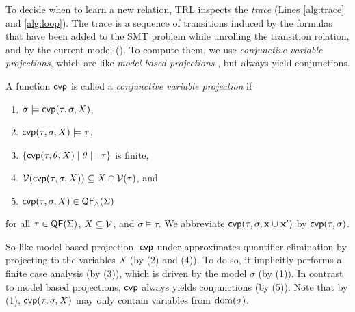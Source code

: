 To decide when to learn a new relation, TRL inspects the \emph{trace} (Lines \ref{alg:trace} and \ref{alg:loop}).
%
The trace is a sequence of transitions induced by the formulas that have been added to the SMT problem while unrolling the transition relation, and by the current model ().
%
To compute them,  we use \emph{conjunctive variable projections}, which are like
\emph{model based projections} \cite{spacer}, but always 
yield\paper{ \pagebreak[3]} conjunctions.%
%
\begin{definition}
  \label{def:projections}
  A function $\mathsf{cvp}$ is called a \emph{conjunctive variable projection} if

  \vspace{-0.5em}
  \noindent
  \begin{minipage}[t]{0.49\textwidth}
    \begin{enumerate}
    \item $\sigma \models \mathsf{cvp}(\tau,\sigma,X)$,
    \item $\mathsf{cvp}(\tau,\sigma,X) \models \tau$,
    \item $\{\mathsf{cvp}(\tau,\theta,X) \mid \theta \models \tau\}$ is finite,
    \end{enumerate}
  \end{minipage}
  \begin{minipage}[t]{0.49\textwidth}
    \begin{enumerate}
      \setcounter{enumi}{3}
    \item $\mathcal{V}(\mathsf{cvp}(\tau,\sigma,X)) \subseteq X \cap \mathcal{V}(\tau)$, and
    \item $\mathsf{cvp}(\tau,\sigma,X) \in \mathsf{QF}_\land(\Sigma)$
    \end{enumerate}
  \end{minipage}
  \medskip

  \noindent
  for all $\tau \in \mathsf{QF}(\Sigma)$, $X \subseteq \mathcal{V}$, and $\sigma \models
  \tau$.
  We abbreviate $\mathsf{cvp}(\tau,\sigma,\bm{\mathrm{x}} \cup \bm{\mathrm{x}}')$ by $\mathsf{cvp}(\tau,\sigma)$.
\end{definition}
%
So like model based projection, $\mathsf{cvp}$ under-approximates quantifier elimination by projecting to the variables $X$ (by (2) and (4)).
%
To do so, it implicitly performs a finite case analysis (by (3)), which is driven by
the model $\sigma$ (by (1)).
%
In contrast to model based projections, $\mathsf{cvp}$ always yields conjunctions (by (5)).
%
Note that by (1),
$\mathsf{cvp}(\tau,\sigma,X)$ may only contain variables from $\operatorname{dom}(\sigma)$.


